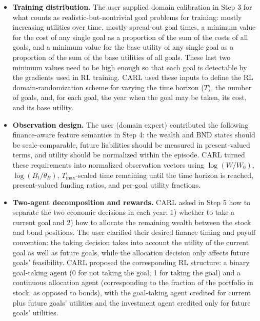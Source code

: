 \documentclass[mnsc,sglanonrev]{informs4}
\begin{document}
\begin{itemize}
\item \textbf{Training distribution.} The user supplied domain calibration in Step 3 for what counts as realistic-but-nontrivial goal problems for training: mostly increasing utilities over time, mostly spread-out goal times, a minimum value for the cost of any single goal as a proportion of the sum of the costs of all goals, and a minimum value for the base utility of any single goal as a proportion of the sum of the base utilities of all goals. These last two minimum values need to be high enough so that each goal is detectable by the gradients used in RL training. CARL used these inputs to define the RL domain-randomization scheme for varying the time horizon ($T$), the number of goals, and, for each goal, the year when the goal may be taken, its cost, and its base utility. 

\item \textbf{Observation design.} The user (domain expert) contributed the following finance-aware feature semantics in Step 4: the wealth and BND states should be scale-comparable, future liabilities should be measured in present-valued terms, and utility should be normalized within the episode. CARL turned these requirements into normalized observation vectors using $\log(W/W_0)$, $\log(B_t/\theta_B)$, $T_{\max}$-scaled time remaining until the time horizon is reached, present-valued funding ratios, and per-goal utility fractions.

\item \textbf{Two-agent decomposition and rewards.} CARL asked in Step 5 how to separate the two economic decisions in each year: 1) whether to take a current goal and 2) how to allocate the remaining wealth between the stock and bond positions. The user clarified their desired finance timing and payoff convention: the taking decision takes into account the utility of the current goal as well as future goals, while the allocation decision only affects future goals' feasibility. CARL proposed the corresponding RL structure: a binary goal-taking agent (0 for not taking the goal; 1 for taking the goal) and a continuous allocation agent (corresponding to the fraction of the portfolio in stock, as opposed to bonds), with the goal-taking agent credited for current plus future goals' utilities and the investment agent credited only for future goals' utilities.


\end{itemize}
\end{document}
